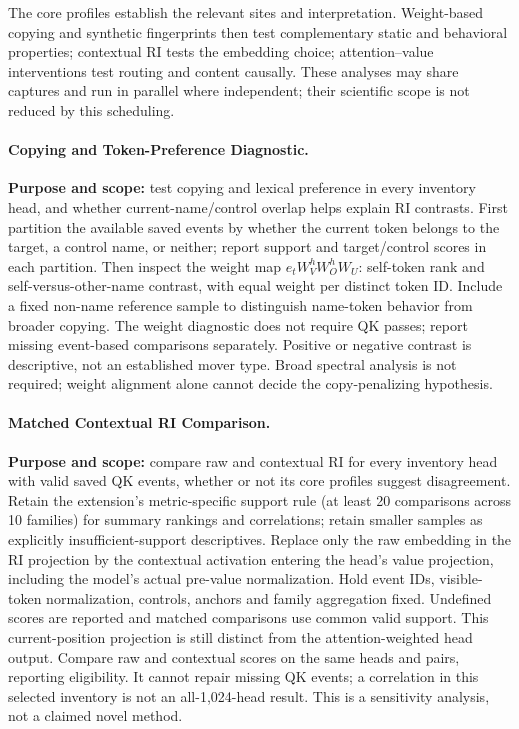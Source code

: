 \documentclass[11pt,a4paper]{article}
\begin{document}
The core profiles establish the relevant sites and interpretation. Weight-based
copying and synthetic fingerprints then test complementary static and behavioral
properties; contextual RI tests the embedding choice; attention--value interventions
test routing and content causally. These analyses may share captures and run in
parallel where independent; their scientific scope is not reduced by this scheduling.

\paragraph{Copying and Token-Preference Diagnostic.}
\textbf{Purpose and scope:} test copying and lexical preference in every inventory
head, and whether current-name/control overlap helps explain RI contrasts.
First partition the available saved events by
whether the current token belongs to the target, a control name, or neither;
report support and target/control scores in each partition. Then inspect the
weight map $e_tW_V^hW_O^hW_U$: self-token rank and self-versus-other-name contrast,
with equal weight per distinct token ID. Include a fixed non-name reference sample
to distinguish name-token behavior from broader copying. The weight diagnostic
does not require QK passes; report missing event-based comparisons separately.
Positive or negative contrast
is descriptive, not an established mover type. Broad spectral analysis is not
required; weight alignment alone cannot decide the copy-penalizing hypothesis.

\paragraph{Matched Contextual RI Comparison.}
\textbf{Purpose and scope:} compare raw and contextual RI for every inventory head
with valid saved QK events, whether or not its core profiles suggest disagreement.
Retain the extension's metric-specific support rule (at least 20 comparisons across
10 families) for summary rankings and correlations; retain smaller samples as
explicitly insufficient-support descriptives. Replace only the raw embedding in the RI projection by the
contextual activation entering the head's value projection, including the model's
actual pre-value normalization. Hold event IDs, visible-token normalization,
controls, anchors and family aggregation fixed. Undefined scores are reported
and matched comparisons use common valid support. This current-position projection
is still distinct from the attention-weighted head output. Compare raw and
contextual scores on the same heads and pairs, reporting eligibility. It cannot
repair missing QK events; a correlation in this selected inventory is not an
all-1,024-head result. This is a sensitivity analysis, not a claimed novel method.
\end{document}
